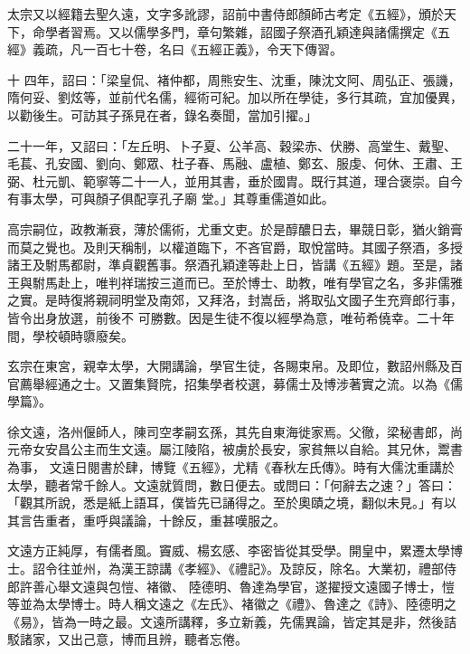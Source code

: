 \begin{pinyinscope}
 太宗又以經籍去聖久遠，文字多訛謬，詔前中書侍郎顏師古考定《五經》，頒於天下，命學者習焉。又以儒學多門，章句繁雜，詔國子祭酒孔穎達與諸儒撰定《五經》義疏，凡一百七十卷，名曰《五經正義》，令天下傳習。



 十
 四年，詔曰：「梁皇侃、褚仲都，周熊安生、沈重，陳沈文阿、周弘正、張譏，隋何妥、劉炫等，並前代名儒，經術可紀。加以所在學徒，多行其疏，宜加優異，以勸後生。可訪其子孫見在者，錄名奏聞，當加引擢。」



 二十一年，又詔曰：「左丘明、卜子夏、公羊高、穀梁赤、伏勝、高堂生、戴聖、毛萇、孔安國、劉向、鄭眾、杜子春、馬融、盧植、鄭玄、服虔、何休、王肅、王弼、杜元凱、範寧等二十一人，並用其書，垂於國胄。既行其道，理合褒崇。自今有事太學，可與顏子俱配享孔子廟
 堂。」其尊重儒道如此。



 高宗嗣位，政教漸衰，薄於儒術，尤重文吏。於是醇醲日去，畢競日彰，猶火銷膏而莫之覺也。及則天稱制，以權道臨下，不吝官爵，取悅當時。其國子祭酒，多授諸王及駙馬都尉，準貞觀舊事。祭酒孔穎達等赴上日，皆講《五經》題。至是，諸王與駙馬赴上，唯判祥瑞按三道而已。至於博士、助教，唯有學官之名，多非儒雅之實。是時復將親祠明堂及南郊，又拜洛，封嵩岳，將取弘文國子生充齊郎行事，皆令出身放選，前後不
 可勝數。因是生徒不復以經學為意，唯茍希僥幸。二十年間，學校頓時隳廢矣。



 玄宗在東宮，親幸太學，大開講論，學官生徒，各賜束帛。及即位，數詔州縣及百官薦舉經通之士。又置集賢院，招集學者校選，募儒士及博涉著實之流。以為《儒學篇》。



 徐文遠，洛州偃師人，陳司空孝嗣玄孫，其先自東海徙家焉。父徹，梁秘書郎，尚元帝女安昌公主而生文遠。屬江陵陷，被虜於長安，家貧無以自給。其兄休，鬻書為事，
 文遠日閱書於肆，博覽《五經》，尤精《春秋左氏傳》。時有大儒沈重講於太學，聽者常千餘人。文遠就質問，數日便去。或問曰：「何辭去之速？」答曰：「觀其所說，悉是紙上語耳，僕皆先已誦得之。至於奧賾之境，翻似未見。」有以其言告重者，重呼與議論，十餘反，重甚嘆服之。



 文遠方正純厚，有儒者風。竇威、楊玄感、李密皆從其受學。開皇中，累遷太學博士。詔令往並州，為漢王諒講《孝經》、《禮記》。及諒反，除名。大業初，禮部侍郎許善心舉文遠與包愷、褚徽、
 陸德明、魯達為學官，遂擢授文遠國子博士，愷等並為太學博士。時人稱文遠之《左氏》、褚徽之《禮》、魯達之《詩》、陸德明之《易》，皆為一時之最。文遠所講釋，多立新義，先儒異論，皆定其是非，然後詰駁諸家，又出己意，博而且辨，聽者忘倦。




\end{pinyinscope}
